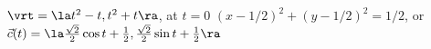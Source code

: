 {$\vrt = \la t^2-t,t^2+t\ra$, at $t=0$
}
{$(x-1/2)^2+(y-1/2)^2 = 1/2$, or $\vec c(t) = \la \frac{\sqrt{2}}{2}\cos t+\frac12, \frac{\sqrt{2}}{2}\sin t+\frac12\ra$ 
}